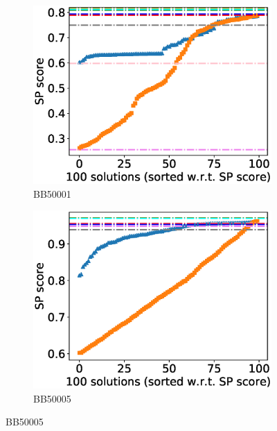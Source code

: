 \begin{figure}[!htbp]
	
	\begin{adjustwidth}{-1cm}{-1cm}
		\centering
		\begin{subfigure}{0.22\textwidth}
			\includegraphics[width=\columnwidth]{Figure/summary/precomputedInit/Balibase/BB50001_pairs_density_single_run_2}
			\caption{BB50001}
		\end{subfigure}	
		\begin{subfigure}{0.22\textwidth}
			\includegraphics[width=\columnwidth]{Figure/summary/precomputedInit/Balibase/BB50005_pairs_density_single_run_2}
			\caption{BB50005}
		\end{subfigure}

\end{adjustwidth}
\end{figure}
